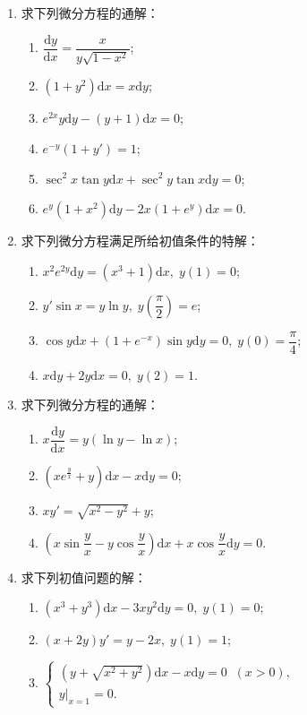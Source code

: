 \begin{enumerate}\setlength{\itemsep}{7pt}
    \item 求下列微分方程的通解：
    \begin{enumerate}[(1)]\setlength{\itemsep}{5pt}\setlength{\topsep}{15pt}
        \item $\dfrac{\text{d}y}{\text{d}x}=\dfrac{x}{y\sqrt{1-x^2}}$;
        \item $(1+y^2)\text{d}x=x\text{d}y$;
        \item $e^{2x}y\text{d}y-(y+1)\text{d}x=0$;
        \item $e^{-y}(1+y')=1$;
        \item $\sec^2x\tan y\text{d}x+\sec^2y\tan x\text{d}y=0$;
        \item $e^y(1+x^2)\text{d}y-2x(1+e^{y})\text{d}x=0$.
    \end{enumerate}

    \item 求下列微分方程满足所给初值条件的特解：
    \begin{enumerate}[(1)]\setlength{\itemsep}{5pt}\setlength{\topsep}{15pt}
        \item $x^2e^{2y}\text{d}y=(x^3+1)\text{d}x,\;y(1)=0$;
        \item $y'\sin x=y\ln y,\;y\left(\dfrac{\pi}{2}\right)=e$;
        \item $\cos y\text{d}x+(1+e^{-x})\sin y\text{d}y=0,\;y(0)=\dfrac{\pi}{4}$;
        \item $x\text{d}y+2y\text{d}x=0,\;y(2)=1$.
    \end{enumerate}

    \item 求下列微分方程的通解：
    \begin{enumerate}[(1)]\setlength{\itemsep}{5pt}\setlength{\topsep}{15pt}
        \item $x\dfrac{\text{d}y}{\text{d}x}=y(\ln y-\ln x)$;
        \item $(xe^{\frac{y}{x}}+y)\text{d}x-x\text{d}y=0$;
        \item $xy'=\sqrt{x^2-y^2}+y$;
        \item $\left(x\sin\dfrac{y}{x}-y\cos\dfrac{y}{x}\right)\text{d}x+x\cos\dfrac{y}{x}\text{d}y=0$.
    \end{enumerate}

    \item 求下列初值问题的解：
    \begin{enumerate}[(1)]\setlength{\itemsep}{5pt}\setlength{\topsep}{15pt}
        \item $(x^3+y^3)\text{d}x-3xy^2\text{d}y=0,\;y(1)=0$;
        \item $(x+2y)y'=y-2x,\;y(1)=1$;
        \item $\begin{cases}
            (y+\sqrt{x^2+y^2})\text{d}x-x\text{d}y=0\;\;(x>0),\\
            y\big|_{x=1}=0.
        \end{cases}$
    \end{enumerate}


\end{enumerate}
